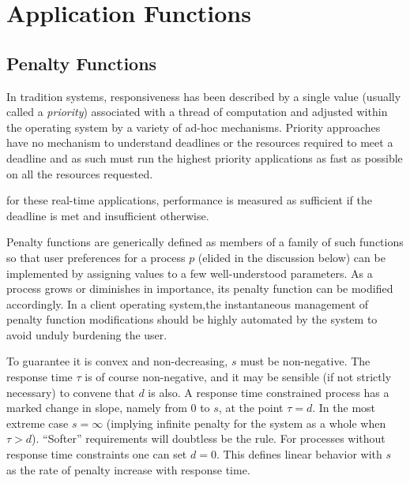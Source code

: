 \section{Application Functions}\label{app_func}
\subsection*{Penalty Functions}

In tradition systems, responsiveness has been described by a single value (usually called a \emph{priority}) associated with a thread of computation and adjusted within the operating system by a variety of ad-hoc mechanisms.   Priority approaches have no mechanism to understand deadlines or the resources required to meet a deadline and as such must run the highest priority applications as fast as possible on all the resources requested. 

for these real-time applications, performance is measured as sufficient if the deadline is met and insufficient otherwise.

Penalty functions  are generically defined as members of a family of such functions
so that user preferences for a process $p$ (elided in the discussion below)
can be implemented by assigning values to a few well-understood parameters.
As a process grows or diminishes in importance, its penalty function can be modified accordingly.
In a client operating system,the instantaneous management of penalty function modifications
should be highly automated by the system to avoid unduly burdening the user.



To guarantee it is convex and non-decreasing, $s$ must be non-negative.
The response time $\tau$  is of course non-negative,
and it may be sensible (if not strictly necessary) to convene that $d$ is also.
A response time constrained process has a marked change in slope, namely from 0 to $s$, at the point $\tau= d$.
In the most extreme case $s = \infty$ (implying infinite penalty for the system as a whole when $\tau > d$).  ``Softer'' requirements will doubtless be the rule.
For processes without response time constraints one can set $d = 0$.
This defines linear behavior with $s$ as the rate of penalty increase with response time.

